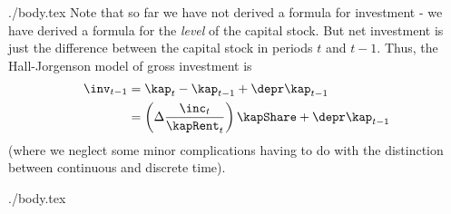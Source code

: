 \documentclass{handout}
\begin{document}
\begin{verbatimwrite}{./body.tex}
Note that so far we have not derived a formula for investment - we 
have derived a formula for the {\it level} of the capital stock.  But 
net investment is just the difference between the capital stock in 
periods $t$ and $t-1$.  Thus, the Hall-Jorgenson model of gross investment is
\begin{equation}\begin{gathered}\begin{aligned}
        \inv_{t-1} & =  \kap_{t}-\kap_{t-1}+\depr \kap_{t-1}  \\
         & =  \left(\Delta \frac{\inc_{t}}{\kapRent_{t}}\right)\kapShare+\depr \kap_{t-1}
\end{aligned}\end{gathered}\end{equation}
(where we neglect some minor complications having to do with the distinction between
continuous and discrete time).

\end{verbatimwrite}
 {./body.tex}


\end{document}
